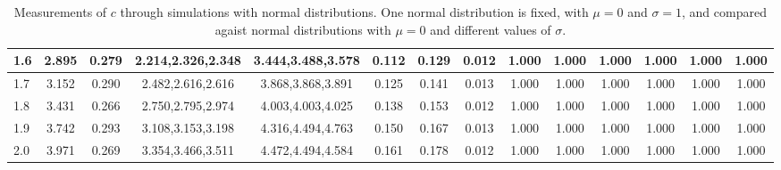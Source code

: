 \begin{table*}[h!]
\begin{center}
\begin{tabular}{| l | c | c | c | c | c | c | c | c | c | c | c | c | c |}
1.6 & 2.895 & 0.279 & 2.214,2.326,2.348 & 3.444,3.488,3.578  & 0.112  & 0.129  & 0.012  & 1.000  & 1.000  & 1.000  & 1.000  & 1.000  & 1.000 \\\hline
1.7 & 3.152 & 0.290 & 2.482,2.616,2.616 & 3.868,3.868,3.891  & 0.125  & 0.141  & 0.013  & 1.000  & 1.000  & 1.000  & 1.000  & 1.000  & 1.000 \\\hline
1.8 & 3.431 & 0.266 & 2.750,2.795,2.974 & 4.003,4.003,4.025  & 0.138  & 0.153  & 0.012  & 1.000  & 1.000  & 1.000  & 1.000  & 1.000  & 1.000 \\\hline
1.9 & 3.742 & 0.293 & 3.108,3.153,3.198 & 4.316,4.494,4.763  & 0.150  & 0.167  & 0.013  & 1.000  & 1.000  & 1.000  & 1.000  & 1.000  & 1.000 \\\hline
2.0 & 3.971 & 0.269 & 3.354,3.466,3.511 & 4.472,4.494,4.584  & 0.161  & 0.178  & 0.012  & 1.000  & 1.000  & 1.000  & 1.000  & 1.000  & 1.000 \\\hline
\end{tabular}
\caption{Measurements of $c$ through simulations
        with normal distributions.
        One normal distribution is fixed, with $\mu=0$ and $\sigma=1$,
        and compared agaist normal distributions with $\mu=0$
        and different values of $\sigma$.}
\end{center}
\end{table*}
